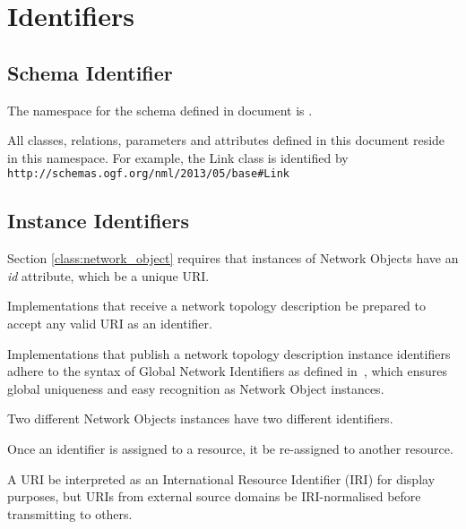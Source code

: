 
\section{Identifiers}%
\label{s:identifiers}

\subsection{Schema Identifier}%
\label{sub:schema_uri}

The namespace for the schema defined in document is .

All classes, relations, parameters and attributes defined in this document reside in this namespace. For example, the Link class is identified by \texttt{http://schemas.ogf.org/nml/2013/05/base\#Link}

\subsection{Instance Identifiers}%
\label{sub:identifiers}

Section \ref{class:network_object} requires that instances of Network Objects \SHOULD{} have an \emph{id} attribute, which \MUST{} be a unique URI.


Implementations that receive a network topology description \MUST{} be prepared to accept any valid URI as an identifier.

Implementations that publish a network topology description instance identifiers \MAY{} adhere to the syntax of Global Network Identifiers as defined in~\cite{gfd-urn-ogf-network}, which ensures global uniqueness and easy recognition as Network Object instances.

Two different Network Objects instances \MUST{} have two different identifiers.

Once an identifier is assigned to a resource, it \MUSTNOT{} be re-assigned to another resource.

A URI \MAY{} be interpreted as an International Resource Identifier (IRI) for display purposes, but URIs from external source domains \MUSTNOT{} be IRI-normalised before transmitting to others.


